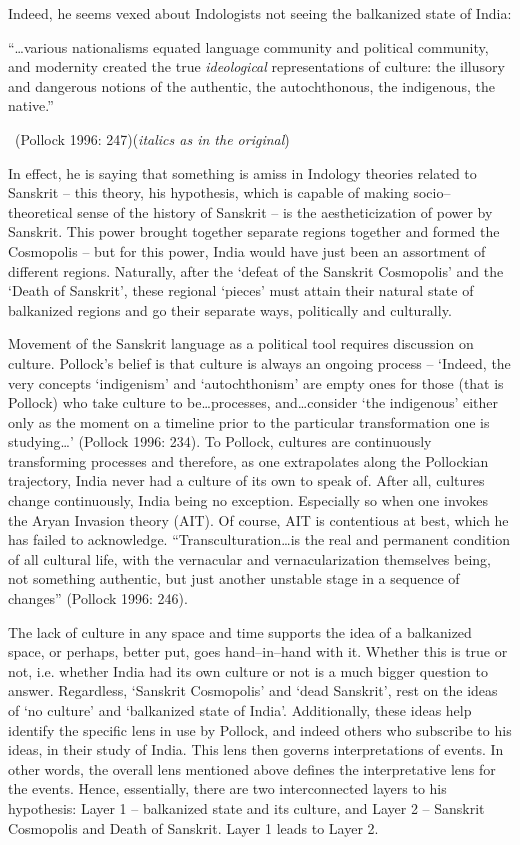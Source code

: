 Indeed, he seems vexed about Indologists not seeing the balkanized state of India:

\begin{myquote}
“…various nationalisms equated language community and political community, and modernity created the true \textit{ideological} representations of culture: the illusory and dangerous notions of the authentic, the autochthonous, the indigenous, the native.” 

~\hfill (Pollock 1996: 247)(\textit{italics as in the original})
\end{myquote}

In effect, he is saying that something is amiss in Indology theories related to Sanskrit – this theory, his hypothesis, which is capable of making socio–theoretical sense of the history of Sanskrit – is the aestheticization of power by Sanskrit. This power brought together separate regions together and formed the Cosmopolis – but for this power, India would have just been an assortment of different regions. Naturally, after the ‘defeat of the Sanskrit Cosmopolis’ and the ‘Death of Sanskrit’, these regional ‘pieces’ must attain their natural state of balkanized regions and go their separate ways, politically and culturally.

Movement of the Sanskrit language as a political tool requires discussion on culture. Pollock’s belief is that culture is always an ongoing process – ‘Indeed, the very concepts ‘indigenism’ and ‘autochthonism’ are empty ones for those (that is Pollock) who take culture to be…processes, and…consider ‘the indigenous’ either only as the moment on a timeline prior to the particular transformation one is studying…’ (Pollock 1996: 234). To Pollock, cultures are continuously transforming processes and therefore, as one extrapolates along the Pollockian trajectory, India never had a culture of its own to speak of. After all, cultures change continuously, India being no exception. Especially so when one invokes the Aryan Invasion theory (AIT). Of course, AIT is contentious at best, which he has failed to acknowledge. “Transculturation…is the real and permanent condition of all cultural life, with the vernacular and vernacularization themselves being, not something authentic, but just another unstable stage in a sequence of changes” (Pollock 1996: 246).

The lack of culture in any space and time supports the idea of a balkanized space, or perhaps, better put, goes hand–in–hand with it. Whether this is true or not, i.e. whether India had its own culture or not is a much bigger question to answer. Regardless, ‘Sanskrit Cosmopolis’ and ‘dead Sanskrit’, rest on the ideas of ‘no culture’ and ‘balkanized state of India’. Additionally, these ideas help identify the specific lens in use by Pollock, and indeed others who subscribe to his ideas, in their study of India. This lens then governs interpretations of events. In other words, the overall lens mentioned above defines the interpretative lens for the events. Hence, essentially, there are two interconnected layers to his hypothesis: Layer 1 – balkanized state and its culture, and Layer 2 – Sanskrit Cosmopolis and Death of Sanskrit. Layer 1 leads to Layer 2.

